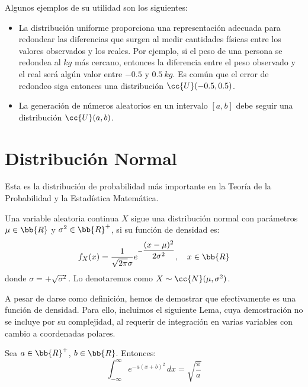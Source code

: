Algunos ejemplos de su utilidad son los siguientes:
\begin{itemize}
    \item La distribución uniforme proporciona una representación adecuada para
    redondear las diferencias que surgen al medir cantidades físicas entre los
    valores observados y los reales.
    Por ejemplo, si el peso de una persona se redondea al $kg$ más cercano,
    entonces la diferencia entre el peso observado y el real será algún valor entre
    $-0.5$ y $0.5~kg$. Es común que el error de redondeo siga entonces una distribución
    $\cc{U}(-0.5,0.5)$.
    
    \item La generación de números aleatorios en un intervalo $[a,b]$ debe seguir una distribución
    $\cc{U}(a,b)$.
\end{itemize}


\section{Distribución Normal}

Esta es la distribución de probabilidad más importante en la Teoría de la Probabilidad y la Estadística Matemática.

\begin{definicion}
    Una variable aleatoria continua $X$ sigue una distribución normal con parámetros $\mu\in \bb{R}$ y $\sigma^2 \in \bb{R}^+$, si su función de densidad es:
    \begin{equation*}
        f_X(x) = \dfrac{1}{\sqrt{2\pi}\sigma} e^{-\dfrac{(x-\mu)^2}{2\sigma^2}}, \quad x\in \bb{R}
    \end{equation*}
    donde $\sigma=+\sqrt{\sigma^2}$.
    Lo denotaremos como $X\sim \cc{N}(\mu,\sigma^2)$.
\end{definicion}

A pesar de darse como definición, hemos de demostrar que efectivamente es una función de densidad.
Para ello, incluimos el siguiente Lema, cuya demostración no se incluye por su complejidad,
al requerir de integración en varias variables con cambio a coordenadas polares.
\begin{lema}
    Sea $a\in\bb{R}^+$, $b\in \bb{R}$. Entonces:
    \begin{equation*}
        \int_{-\infty}^{\infty} e^{-a(x+b)^2} \, dx = \sqrt{\dfrac{\pi}{a}}
    \end{equation*}
\end{lema}

